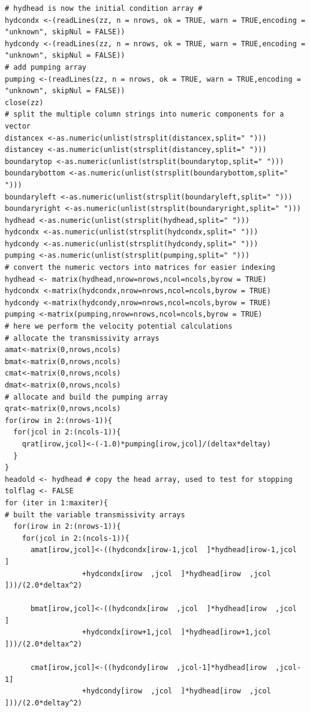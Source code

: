 \begin{lstlisting}[caption= \textbf{R} script implementing unconfined aquifer flow computations with wells and generalized boundary conditions. , label=lst:UnconfinedSteady]
# hydhead is now the initial condition array #
hydcondx <-(readLines(zz, n = nrows, ok = TRUE, warn = TRUE,encoding = "unknown", skipNul = FALSE))
hydcondy <-(readLines(zz, n = nrows, ok = TRUE, warn = TRUE,encoding = "unknown", skipNul = FALSE))
# add pumping array
pumping <-(readLines(zz, n = nrows, ok = TRUE, warn = TRUE,encoding = "unknown", skipNul = FALSE))
close(zz)
# split the multiple column strings into numeric components for a vector
distancex <-as.numeric(unlist(strsplit(distancex,split=" ")))
distancey <-as.numeric(unlist(strsplit(distancey,split=" ")))
boundarytop <-as.numeric(unlist(strsplit(boundarytop,split=" ")))
boundarybottom <-as.numeric(unlist(strsplit(boundarybottom,split=" ")))
boundaryleft <-as.numeric(unlist(strsplit(boundaryleft,split=" ")))
boundaryright <-as.numeric(unlist(strsplit(boundaryright,split=" ")))
hydhead <-as.numeric(unlist(strsplit(hydhead,split=" ")))
hydcondx <-as.numeric(unlist(strsplit(hydcondx,split=" ")))
hydcondy <-as.numeric(unlist(strsplit(hydcondy,split=" ")))
pumping <-as.numeric(unlist(strsplit(pumping,split=" ")))
# convert the numeric vectors into matrices for easier indexing
hydhead <- matrix(hydhead,nrow=nrows,ncol=ncols,byrow = TRUE)
hydcondx <-matrix(hydcondx,nrow=nrows,ncol=ncols,byrow = TRUE)
hydcondy <-matrix(hydcondy,nrow=nrows,ncol=ncols,byrow = TRUE)
pumping <-matrix(pumping,nrow=nrows,ncol=ncols,byrow = TRUE)
# here we perform the velocity potential calculations
# allocate the transmissivity arrays
amat<-matrix(0,nrows,ncols) 
bmat<-matrix(0,nrows,ncols) 
cmat<-matrix(0,nrows,ncols)
dmat<-matrix(0,nrows,ncols)
# allocate and build the pumping array
qrat<-matrix(0,nrows,ncols)
for(irow in 2:(nrows-1)){
  for(jcol in 2:(ncols-1)){
    qrat[irow,jcol]<-(-1.0)*pumping[irow,jcol]/(deltax*deltay)
  }
}
headold <- hydhead # copy the head array, used to test for stopping 
tolflag <- FALSE
for (iter in 1:maxiter){
# built the variable transmissivity arrays
  for(irow in 2:(nrows-1)){
    for(jcol in 2:(ncols-1)){
      amat[irow,jcol]<-((hydcondx[irow-1,jcol  ]*hydhead[irow-1,jcol  ]
                  +hydcondx[irow  ,jcol  ]*hydhead[irow  ,jcol  ]))/(2.0*deltax^2)
      
      bmat[irow,jcol]<-((hydcondx[irow  ,jcol  ]*hydhead[irow  ,jcol  ]
                  +hydcondx[irow+1,jcol  ]*hydhead[irow+1,jcol  ]))/(2.0*deltax^2)
      
      cmat[irow,jcol]<-((hydcondy[irow  ,jcol-1]*hydhead[irow  ,jcol-1]
                  +hydcondy[irow  ,jcol  ]*hydhead[irow  ,jcol  ]))/(2.0*deltay^2)
      

\end{lstlisting}
